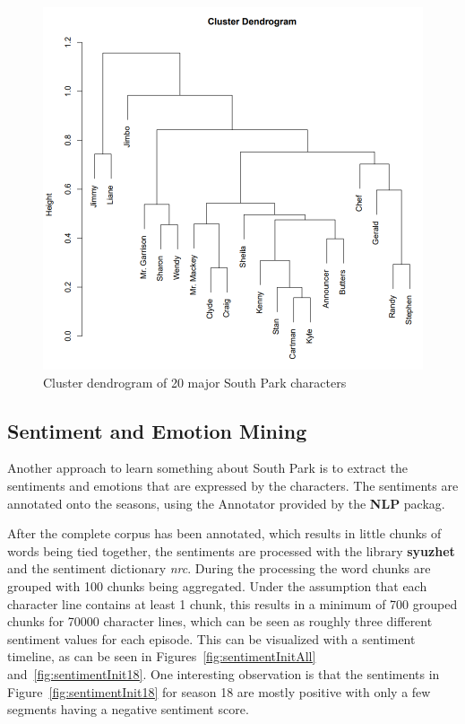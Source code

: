 \documentclass[10pt,a4paper]{article}
\begin{document}
		\begin{figure}[h]
	\centering
	\includegraphics[scale=0.4]{images/Dendrogram.png}
	\caption{Cluster dendrogram of 20 major South Park characters}
	\label{fig:Dendrogram}
	\end{figure}
	\FloatBarrier
	\newpage
	\subsection{Sentiment and Emotion Mining}
	Another approach to learn something about South Park is to extract the sentiments and emotions that are expressed by the characters. The sentiments are annotated onto the seasons, using the Annotator provided by the \textbf{NLP} packag.
	
	After the complete corpus has been annotated, which results in little chunks of words being tied together, the sentiments are processed with the library \textbf{syuzhet} and the sentiment dictionary \textit{nrc}.
	During the processing the word chunks are grouped with 100 chunks being aggregated. Under the assumption that each character line contains at least 1 chunk, this results in a minimum of 700 grouped chunks for 70000 character lines, which can be seen as roughly three different sentiment values for each episode. This can be visualized with a sentiment timeline, as can be seen in Figures~\ref{fig:sentimentInitAll} and~\ref{fig:sentimentInit18}. One interesting observation is that the sentiments in Figure~\ref{fig:sentimentInit18} for season 18 are mostly positive with only a few segments having a negative sentiment score.
		
\end{document}
